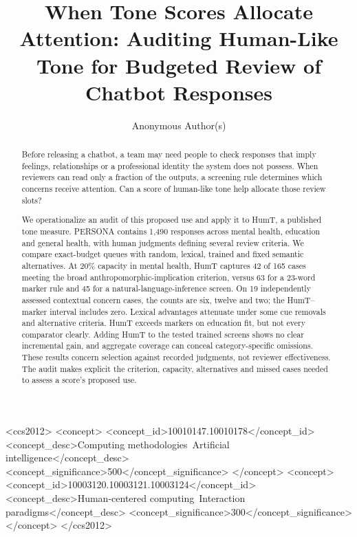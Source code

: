 \documentclass[manuscript,screen,review,anonymous]{acmart}
\title[Auditing Tone Scores for Budgeted Review]{When Tone Scores Allocate Attention: Auditing Human-Like Tone for Budgeted Review of Chatbot Responses}
\author{Anonymous Author(s)}
\begin{document}
\begin{abstract}
Before releasing a chatbot, a team may need people to check responses that imply feelings, relationships or a professional identity the system does not possess. When reviewers can read only a fraction of the outputs, a screening rule determines which concerns receive attention. Can a score of human-like tone help allocate those review slots?

We operationalize an audit of this proposed use and apply it to HumT, a published tone measure. PERSONA contains 1,490 responses across mental health, education and general health, with human judgments defining several review criteria. We compare exact-budget queues with random, lexical, trained and fixed semantic alternatives. At 20\% capacity in mental health, HumT captures 42 of 165 cases meeting the broad anthropomorphic-implication criterion, versus 63 for a 23-word marker rule and 45 for a natural-language-inference screen. On 19 independently assessed contextual concern cases, the counts are six, twelve and two; the HumT--marker interval includes zero. Lexical advantages attenuate under some cue removals and alternative criteria. HumT exceeds markers on education fit, but not every comparator clearly. Adding HumT to the tested trained screens shows no clear incremental gain, and aggregate coverage can conceal category-specific omissions. These results concern selection against recorded judgments, not reviewer effectiveness. The audit makes explicit the criterion, capacity, alternatives and missed cases needed to assess a score's proposed use.
\end{abstract}
\begin{CCSXML}
<ccs2012>
 <concept>
  <concept_id>10010147.10010178</concept_id>
  <concept_desc>Computing methodologies~Artificial intelligence</concept_desc>
  <concept_significance>500</concept_significance>
 </concept>
 <concept>
  <concept_id>10003120.10003121.10003124</concept_id>
  <concept_desc>Human-centered computing~Interaction paradigms</concept_desc>
  <concept_significance>300</concept_significance>
 </concept>
</ccs2012>
\end{CCSXML}
\maketitle

\end{document}
